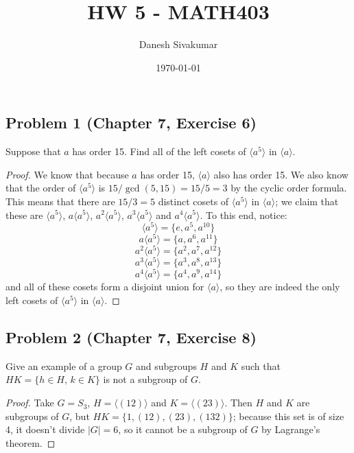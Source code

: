 \documentclass{article}
\title{HW 5 - MATH403}
\author{Danesh Sivakumar}
\date\today
\begin{document}
\maketitle 

\subsection*{Problem 1 (Chapter 7, Exercise 6)}
Suppose that $a$ has order 15. Find all of the left cosets of $\langle a^5 \rangle$ in $\langle a \rangle$.

\begin{proof}
We know that because $a$ has order 15, $\langle a \rangle$ also has order 15. We also know that the order of $\langle a^5 \rangle$ is $15/\gcd{(5, 15)} = 15/5 = 3$ by the cyclic order formula. This means that there are $15/3 = 5$ distinct cosets of $\langle a^5 \rangle$ in $\langle a \rangle$; we claim that these are $\langle a^5 \rangle$, $a\langle a^5 \rangle$, $a^2\langle a^5 \rangle$, $a^3\langle a^5 \rangle$ and $a^4\langle a^5 \rangle$. To this end, notice: 
\[\langle a^5 \rangle = \{e, a^5, a^{10}\}\]
\[a\langle a^5 \rangle = \{a, a^6, a^{11}\}\]
\[a^2\langle a^5 \rangle = \{a^2, a^7, a^{12}\}\]
\[a^3\langle a^5 \rangle = \{a^3, a^8, a^{13}\}\]
\[a^4\langle a^5 \rangle = \{a^4, a^9, a^{14}\}\]
and all of these cosets form a disjoint union for $\langle a \rangle$, so they are indeed the only left cosets of $\langle a^5 \rangle$ in $\langle a \rangle$.
\end{proof}


\subsection*{Problem 2 (Chapter 7, Exercise 8)}
Give an example of a group $G$ and subgroups $H$ and $K$ such that $HK = \{h \in H,\, k \in K\}$ is not a subgroup of $G$.

\begin{proof}
Take $G = S_3$, $H = \langle (12) \rangle$ and $K = \langle (23) \rangle$. Then $H$ and $K$ are subgroups of $G$, but $HK = \{1, (12), (23), (132)\}$; because this set is of size 4, it doesn't divide $|G| = 6$, so it cannot be a subgroup of $G$ by Lagrange's theorem. 

\end{proof}
\end{document}
